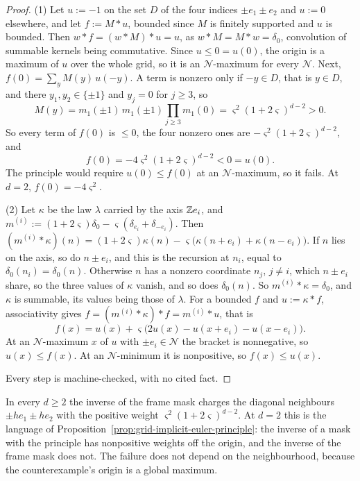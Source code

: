 \begin{proof}
(1) Let $u := -1$ on the set $D$ of the four indices $\pm e_1 \pm e_2$ and $u := 0$ elsewhere, and
let $f := M * u$, bounded since $M$ is finitely supported and $u$ is bounded. Then
$w * f = (w * M) * u = u$, as $w * M = M * w = \delta_0$, convolution of summable kernels being
commutative. Since $u \le 0 = u(0)$, the origin is a maximum of $u$ over the whole
grid, so it is an $\mathcal{N}$-maximum for every $\mathcal{N}$. Next,
$f(0) = \sum_yM(y)\,u(-y)$. A term is nonzero only if $-y \in D$, that is $y \in D$, and there
$y_1, y_2 \in \{\pm1\}$ and $y_j = 0$ for $j \ge 3$, so
\[
M(y) = m_1(\pm1)\,m_1(\pm1)\prod_{j \ge 3}m_1(0) = \varsigma^2(1 + 2\varsigma)^{d-2} > 0 .
\]
So every term of $f(0)$ is $\le 0$, the four nonzero ones are $-\varsigma^2(1 + 2\varsigma)^{d-2}$,
and
\[
f(0) = -4\varsigma^2(1 + 2\varsigma)^{d-2} < 0 = u(0) .
\]
The principle would require $u(0) \le f(0)$ at an $\mathcal{N}$-maximum, so it fails. At $d = 2$,
$f(0) = -4\varsigma^2$.

(2) Let $\kappa$ be the law $\lambda$ carried by the axis $\mathbb{Z} e_i$, and
$m^{(i)} := (1 + 2\varsigma)\delta_0 - \varsigma(\delta_{e_i} + \delta_{-e_i})$. Then
$(m^{(i)} * \kappa)(n) = (1 + 2\varsigma)\kappa(n) - \varsigma\bigl(\kappa(n + e_i) +
\kappa(n - e_i)\bigr)$. If $n$ lies on the axis, so do $n \pm e_i$, and this is the recursion at
$n_i$, equal to $\delta_0(n_i) = \delta_0(n)$. Otherwise $n$ has a nonzero coordinate $n_j$,
$j \ne i$, which $n \pm e_i$ share, so the three values of $\kappa$ vanish, and so does
$\delta_0(n)$. So $m^{(i)} * \kappa = \delta_0$, and $\kappa$ is summable, its values being those
of $\lambda$. For a bounded $f$ and $u := \kappa * f$, associativity gives
$f = (m^{(i)} * \kappa) * f = m^{(i)} * u$, that is
\[
f(x) = u(x) + \varsigma\bigl(2u(x) - u(x + e_i) - u(x - e_i)\bigr) .
\]
At an $\mathcal{N}$-maximum $x$ of $u$ with $\pm e_i \in \mathcal{N}$ the bracket is nonnegative,
so $u(x) \le f(x)$. At an $\mathcal{N}$-minimum it is nonpositive, so $f(x) \le u(x)$.

Every step is machine-checked, with no cited fact.
\end{proof}

In every $d \ge 2$ the inverse of the frame mask charges the diagonal neighbours $\pm he_1 \pm he_2$
with the positive weight $\varsigma^2(1 + 2\varsigma)^{d-2}$. At $d = 2$ this is the language of
Proposition~\ref{prop:grid-implicit-euler-principle}: the inverse of a mask with the principle has
nonpositive weights off the origin, and the inverse of the frame mask does not. The failure does
not depend on the neighbourhood, because the counterexample's origin is a global maximum.

